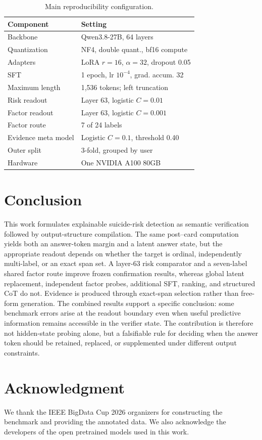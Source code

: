 \documentclass[conference]{IEEEtran}
\begin{document}
\begin{table}[t]
\caption{Main reproducibility configuration.}
\label{tab:config}
\centering
\begin{tabular}{ll}
\toprule
Component & Setting \\
\midrule
Backbone & Qwen3.8-27B, 64 layers \\
Quantization & NF4, double quant., bf16 compute \\
Adapters & LoRA $r=16$, $\alpha=32$, dropout 0.05 \\
SFT & 1 epoch, lr $10^{-4}$, grad. accum. 32 \\
Maximum length & 1,536 tokens; left truncation \\
Risk readout & Layer 63, logistic $C=0.01$ \\
Factor readout & Layer 63, logistic $C=0.001$ \\
Factor route & 7 of 24 labels \\
Evidence meta model & Logistic $C=0.1$, threshold 0.40 \\
Outer split & 3-fold, grouped by user \\
Hardware & One NVIDIA A100 80GB \\
\bottomrule
\end{tabular}
\end{table}

\section{Conclusion}
This work formulates explainable suicide-risk detection as semantic verification followed by output-structure compilation. The same post--card computation yields both an answer-token margin and a latent answer state, but the appropriate readout depends on whether the target is ordinal, independently multi-label, or an exact span set. A layer-63 risk comparator and a seven-label shared factor route improve frozen confirmation results, whereas global latent replacement, independent factor probes, additional SFT, ranking, and structured CoT do not. Evidence is produced through exact-span selection rather than free-form generation. The combined results support a specific conclusion: some benchmark errors arise at the readout boundary even when useful predictive information remains accessible in the verifier state. The contribution is therefore not hidden-state probing alone, but a falsifiable rule for deciding when the answer token should be retained, replaced, or supplemented under different output constraints.

\section*{Acknowledgment}
We thank the IEEE BigData Cup 2026 organizers for constructing the benchmark and providing the annotated data. We also acknowledge the developers of the open pretrained models used in this work.

\balance


\end{document}

